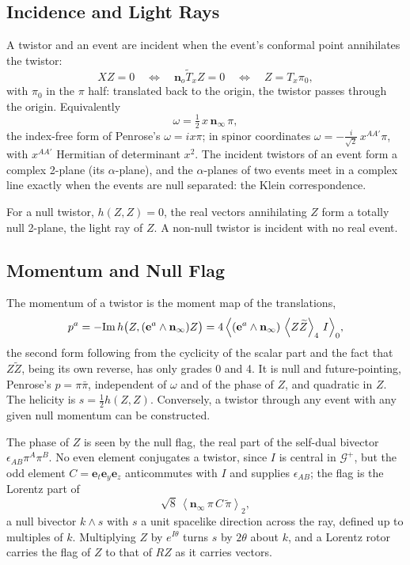 \documentclass[11pt,a4paper]{article}
\newcommand{\G}{\mathcal{G}}
\newcommand{\nzero}{\mathbf{n}_o}
\newcommand{\ninf}{\mathbf{n}_\infty}
\newcommand{\e}{\mathbf{e}}
\newcommand{\wedgeprod}{\mathbin{\wedge}}
\newcommand{\rev}[1]{\widetilde{#1}}
\newcommand{\grade}[2]{\left\langle #1\right\rangle_{#2}}
\begin{document}
\subsection{Incidence and Light Rays}

A twistor and an event are incident when the event's conformal point
annihilates the twistor:
\[
    \boxed{
        XZ=0
        \quad\Longleftrightarrow\quad
        \nzero\rev{T}_xZ=0
        \quad\Longleftrightarrow\quad
        Z=T_x\pi_0 ,
    }
\]
with \(\pi_0\) in the \(\pi\) half: translated back to the origin, the
twistor passes through the origin. Equivalently
\[
    \omega=\tfrac12\,x\,\ninf\,\pi,
\]
the index-free form of Penrose's \(\omega=ix\pi\); in spinor
coordinates \(\omega=-\tfrac{i}{\sqrt2}\,x^{AA'}\pi\), with \(x^{AA'}\)
Hermitian of determinant \(x^2\). The incident twistors of an event
form a complex 2-plane (its \(\alpha\)-plane), and the
\(\alpha\)-planes of two events meet in a complex line exactly when
the events are null separated: the Klein correspondence.

For a null twistor, \(h(Z,Z)=0\), the real vectors annihilating \(Z\)
form a totally null 2-plane, the light ray of \(Z\). A non-null
twistor is incident with no real event.

\subsection{Momentum and Null Flag}

The momentum of a twistor is the moment map of the translations,
\[
    p^a=-\mathrm{Im}\,h\bigl(Z,(\e^a\wedgeprod\ninf)Z\bigr)
    =4\,\Bigl\langle(\e^a\wedgeprod\ninf)\,
        \grade{Z\rev Z}{4}\,I\Bigr\rangle_0 ,
\]
the second form following from the cyclicity of the scalar part and
the fact that \(Z\rev Z\), being its own reverse, has only grades 0
and 4. It is null and future-pointing, Penrose's \(p=\pi\bar\pi\),
independent of \(\omega\) and of the phase of \(Z\), and quadratic in
\(Z\). The helicity is \(s=\tfrac12h(Z,Z)\). Conversely, a twistor
through any event with any given null momentum can be constructed.

The phase of \(Z\) is seen by the null flag, the real part of the
self-dual bivector \(\epsilon_{AB}\pi^A\pi^B\). No even element
conjugates a twistor, since \(I\) is central in \(\G^+\), but the odd
element \(C=\e_t\e_y\e_z\) anticommutes with \(I\) and supplies
\(\epsilon_{AB}\); the flag is the Lorentz part of
\[
    \sqrt8\,\grade{\ninf\,\pi\,C\,\rev\pi}{2},
\]
a null bivector \(k\wedgeprod s\) with \(s\) a unit spacelike
direction across the ray, defined up to multiples of \(k\).
Multiplying \(Z\) by \(e^{I\theta}\) turns \(s\) by \(2\theta\) about
\(k\), and a Lorentz rotor carries the flag of \(Z\) to that of \(RZ\)
as it carries vectors.
\end{document}
